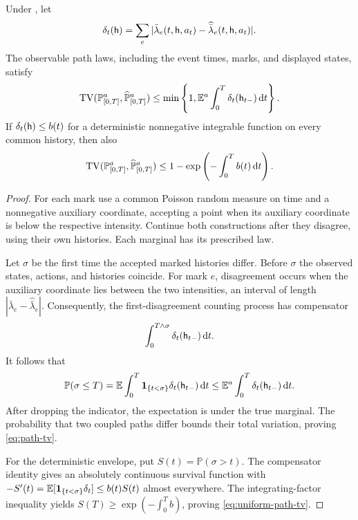 \begin{theorem}\label{thm:path}
Under , let
\begin{equation}
 \delta_t(\mathsf h)=\sum_e
 |\bar\lambda_e(t,\mathsf h,a_t)-\widehat{\bar\lambda}_e(t,\mathsf h,a_t)|.
\end{equation}
The observable path laws, including the event times, marks, and displayed states, satisfy
\begin{equation}\label{eq:path-tv}
 \operatorname{TV}(\mathbb P^a_{[0,T]},\widehat{\mathbb P}^a_{[0,T]})
 \le \min\left\{1,\mathbb E^a\int_0^T\delta_t(\mathsf h_{t-})\,\mathrm d t\right\}.
\end{equation}
If $\delta_t(\mathsf h)\le b(t)$ for a deterministic nonnegative integrable function on every common history, then also
\begin{equation}\label{eq:uniform-path-tv}
 \operatorname{TV}(\mathbb P^a_{[0,T]},\widehat{\mathbb P}^a_{[0,T]})
 \le 1-\exp\left(-\int_0^T b(t)\,\mathrm d t\right).
\end{equation}
\end{theorem}
\begin{proof}
For each mark use a common Poisson random measure on time and a nonnegative auxiliary coordinate, accepting a point when its auxiliary coordinate is below the respective intensity. Continue both constructions after they disagree, using their own histories. Each marginal has its prescribed law.

Let $\sigma$ be the first time the accepted marked histories differ. Before $\sigma$ the observed states, actions, and histories coincide. For mark $e$, disagreement occurs when the auxiliary coordinate lies between the two intensities, an interval of length
$|\bar\lambda_e-\widehat{\bar\lambda}_e|$. Consequently, the first-disagreement counting process has compensator
\[
 \int_0^{T\wedge\sigma}\delta_t(\mathsf h_{t-})\,\mathrm d t.
\]
It follows that
\[
 \mathbb P(\sigma\le T)
 =\mathbb E\int_0^T\mathbf1_{\{t<\sigma\}}\delta_t(\mathsf h_{t-})\,\mathrm d t
 \le\mathbb E^a\int_0^T\delta_t(\mathsf h_{t-})\,\mathrm d t.
\]
After dropping the indicator, the expectation is under the true marginal. The probability that two coupled paths differ bounds their total variation, proving \eqref{eq:path-tv}.

For the deterministic envelope, put $S(t)=\mathbb P(\sigma>t)$. The compensator identity gives an absolutely continuous survival function with
$-S'(t)=\mathbb E[\mathbf1_{\{t<\sigma\}}\delta_t]\le b(t)S(t)$ almost everywhere.
The integrating-factor inequality yields
$S(T)\ge\exp(-\int_0^T b)$, proving \eqref{eq:uniform-path-tv}.
\end{proof}

